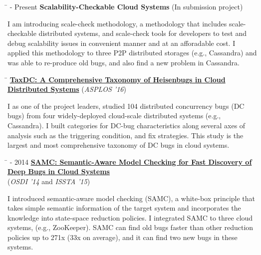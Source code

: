 \documentclass[10pt]{article} %
\begin{document}
\begin{tabbing}
\hspace{2.5cm} \=  - Present \>\+ \textbf{Scalability-Checkable Cloud Systems} (In submission project) \\
\begin{minipage}{\smallertextwidth}
I am introducing scale-check methodology, a methodology that includes
scale-checkable distributed systems, and scale-check tools for developers to
test and debug scalability issues in convenient manner and at an afforadable
cost. I applied this methodology to three P2P distributed storages (e.g.,
Cassandra) and was able to re-produce old bugs, and also find a new problem in
Cassandra.
\end{minipage}
\end{tabbing}

\begin{tabbing}
\hspace{2.5cm} \=  \>\+ \href{http://ucare.cs.uchicago.edu/pdf/asplos16-TaxDC.pdf}{\textbf{TaxDC: A Comprehensive Taxonomy of Heisenbugs in Cloud Distributed Systems}} (\textit{ASPLOS '16}) \\
\begin{minipage}{\smallertextwidth}
I as one of the project leaders, studied 104 distributed concurrency bugs (DC
bugs) from four widely-deployed cloud-scale distributed systems (e.g.,
Cassandra). I built categories for DC-bug characteristics along several axes of
analysis such as the triggering condition, and fix strategies. This study is the
largest and most comprehensive taxonomy of DC bugs in cloud systems.
\end{minipage}
\end{tabbing}

\begin{tabbing}
\hspace{2.5cm} \=  - 2014 \> \href{http://ucare.cs.uchicago.edu/pdf/osdi14-samc.pdf}{\textbf{SAMC: Semantic-Aware Model Checking for Fast Discovery of Deep Bugs in Cloud Systems}} \\
\>\+ (\textit{OSDI '14} and \textit{ISSTA '15}) \\
\begin{minipage}{\smallertextwidth}
I introduced semantic-aware model checking (SAMC), a white-box principle that
takes simple semantic information of the target system and incorporates the
knowledge into state-space reduction policies. I integrated SAMC to three cloud
systems, (e.g., ZooKeeper). SAMC can find old bugs faster than other reduction
policies up to 271x (33x on average), and it can find two new bugs in these
systems.
\end{minipage}
\end{tabbing}
\end{document}
